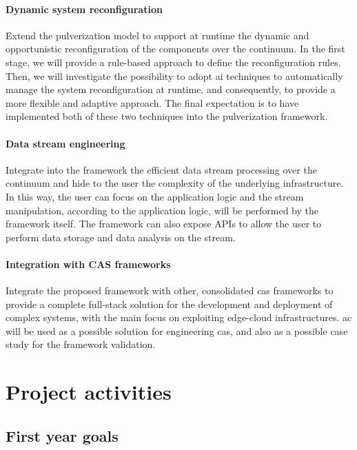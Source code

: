 \documentclass[12pt]{article}
\newcommand{\meta}[1]{{\color{blue}#1}}
\begin{document}
\paragraph{Dynamic system reconfiguration}
Extend the pulverization model to support at runtime the dynamic and opportunistic reconfiguration of the components over the continuum.
%
In the first stage,
we will provide a rule-based approach to define the reconfiguration rules.
%
Then,
we will investigate the possibility to adopt \ac{ai} techniques to automatically manage the system reconfiguration at runtime,
and consequently,
to provide a more flexible and adaptive approach.
%
The final expectation is to have implemented both of these two techniques into the pulverization framework.

\paragraph{Data stream engineering}
\meta{
Integrate into the framework the efficient data stream processing over the continuum and hide to the user the complexity of the underlying infrastructure.
%
In this way,
the user can focus on the application logic and the stream manipulation,
according to the application logic,
will be performed by the framework itself.
%
The framework can also expose APIs to allow the user to perform data storage and data analysis on the stream.
}

\paragraph{Integration with CAS frameworks}
Integrate the proposed framework with other, consolidated \ac{cas} frameworks
to provide a complete full-stack solution for the development and deployment of complex systems,
with the main focus on exploiting edge-cloud infrastructures.
%
\ac{ac} will be used as a possible solution for engineering \ac{cas},
and also as a possible case study for the framework validation.


\section{Project activities}\label{sec:activities}

\subsection{First year goals}\label{subsec:first-year-activities}
\end{document}

